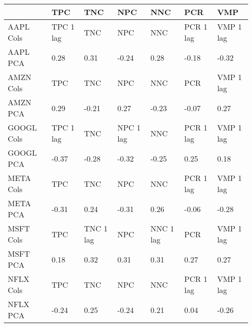\begin{tabular}{lllllll}
\toprule
{} &        TPC &        TNC &        NPC &        NNC &        PCR &        VMP \\
\midrule
AAPL Cols  &  TPC 1 lag &        TNC &        NPC &        NNC &  PCR 1 lag &  VMP 1 lag \\
AAPL PCA   &       0.28 &       0.31 &      -0.24 &       0.28 &      -0.18 &      -0.32 \\
AMZN Cols  &        TPC &        TNC &        NPC &        NNC &        PCR &  VMP 1 lag \\
AMZN PCA   &       0.29 &      -0.21 &       0.27 &      -0.23 &      -0.07 &       0.27 \\
GOOGL Cols &  TPC 1 lag &        TNC &  NPC 1 lag &        NNC &  PCR 1 lag &  VMP 1 lag \\
GOOGL PCA  &      -0.37 &      -0.28 &      -0.32 &      -0.25 &       0.25 &       0.18 \\
META Cols  &        TPC &        TNC &        NPC &        NNC &  PCR 1 lag &  VMP 1 lag \\
META PCA   &      -0.31 &       0.24 &      -0.31 &       0.26 &      -0.06 &      -0.28 \\
MSFT Cols  &        TPC &  TNC 1 lag &        NPC &  NNC 1 lag &        PCR &  VMP 1 lag \\
MSFT PCA   &       0.18 &       0.32 &       0.31 &       0.31 &       0.27 &       0.27 \\
NFLX Cols  &        TPC &        TNC &        NPC &        NNC &  PCR 1 lag &  VMP 1 lag \\
NFLX PCA   &      -0.24 &       0.25 &      -0.24 &       0.21 &       0.04 &      -0.26 \\
\bottomrule
\end{tabular}

